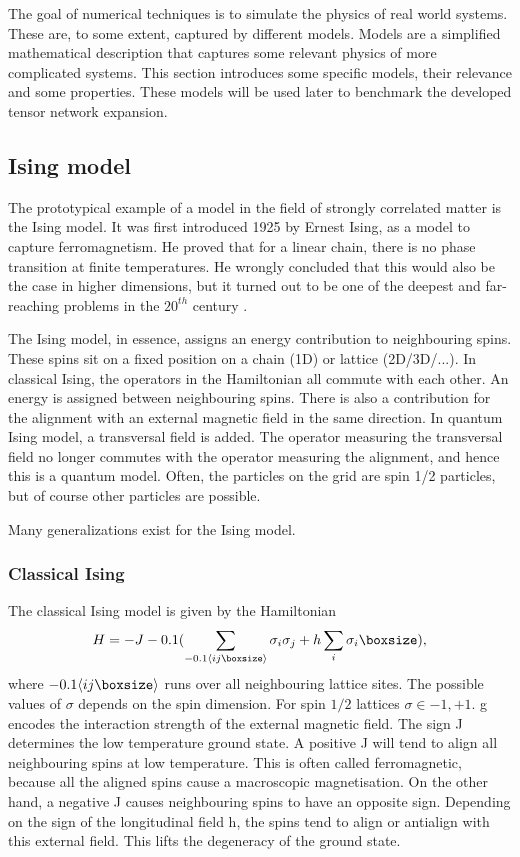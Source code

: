 The goal of numerical techniques is to simulate the physics of real world systems. These are, to some extent, captured by different models. Models are a simplified mathematical description that captures some relevant physics of more complicated systems. This section introduces some specific models, their relevance and some properties. These models will be used later to benchmark the developed tensor network expansion.

\subsection{Ising model}

The prototypical example of a model in the field of strongly correlated matter is the Ising model. It was first introduced 1925 by Ernest Ising, as a model to capture ferromagnetism. He proved that for a linear chain, there is no phase transition at finite temperatures. He wrongly concluded that this would also be the case in higher dimensions, but it turned out to be one of the deepest and far-reaching problems in the $20^{th}$ century \cite{Taroni2015}.

The Ising model, in essence, assigns an energy contribution to neighbouring spins. These spins sit on a fixed position on a chain (1D) or lattice (2D/3D/...). In classical Ising, the operators in the Hamiltonian all commute with each other. An energy is assigned between neighbouring spins. There is also a contribution for the alignment with an external magnetic field in the same direction. In quantum Ising model, a transversal field is added. The operator measuring the transversal field no longer commutes with the operator measuring the alignment, and hence this is a quantum model. Often, the particles on the grid are spin 1/2 particles, but of course other particles are possible.

Many generalizations exist for the Ising model. 

\subsubsection{Classical Ising}

The classical Ising model is given by the Hamiltonian
\begin{equation}
    H = -J \left (  \sum_{\Braket{i j }} \sigma_i \sigma_j + h \sum_i \sigma_i \right ),
\end{equation}
where $  \Braket{i j }$ runs over all neighbouring lattice sites. The possible values of $\sigma$ depends on the spin dimension. For spin $1/2$ lattices $\sigma \in {-1,+1}$. g encodes the interaction strength of the external magnetic field. The sign J determines the low temperature ground state. A positive J will tend to align all neighbouring spins at low temperature. This is often called ferromagnetic, because all the aligned spins cause a macroscopic magnetisation. On the other hand, a negative J causes neighbouring spins to have an opposite sign. Depending on the sign of the longitudinal field h, the spins tend to align or antialign with this external field. This lifts the degeneracy of the ground state.

